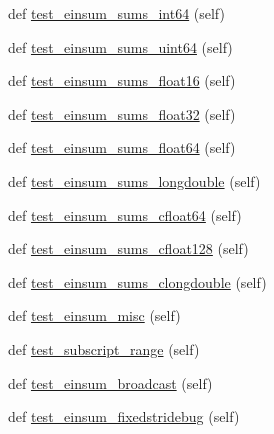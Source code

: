 \begin{DoxyCompactItemize}
def \hyperlink{classnumpy_1_1core_1_1tests_1_1test__einsum_1_1TestEinsum_aa2dd38c36119277677602bc46c2e0f1a}{test\+\_\+einsum\+\_\+sums\+\_\+int64} (self)
\item 
def \hyperlink{classnumpy_1_1core_1_1tests_1_1test__einsum_1_1TestEinsum_ab7b209c9221a5b3029df0ca154565142}{test\+\_\+einsum\+\_\+sums\+\_\+uint64} (self)
\item 
def \hyperlink{classnumpy_1_1core_1_1tests_1_1test__einsum_1_1TestEinsum_a722e8956945e9c36729a3aa8fa747ea9}{test\+\_\+einsum\+\_\+sums\+\_\+float16} (self)
\item 
def \hyperlink{classnumpy_1_1core_1_1tests_1_1test__einsum_1_1TestEinsum_abf27c0fde3488d8520919bbbaedc9920}{test\+\_\+einsum\+\_\+sums\+\_\+float32} (self)
\item 
def \hyperlink{classnumpy_1_1core_1_1tests_1_1test__einsum_1_1TestEinsum_a16195da60b307dffff623d81f641a70b}{test\+\_\+einsum\+\_\+sums\+\_\+float64} (self)
\item 
def \hyperlink{classnumpy_1_1core_1_1tests_1_1test__einsum_1_1TestEinsum_a954d7ff653c47415f84c746c347609b7}{test\+\_\+einsum\+\_\+sums\+\_\+longdouble} (self)
\item 
def \hyperlink{classnumpy_1_1core_1_1tests_1_1test__einsum_1_1TestEinsum_a37d38f4773cf145da8b882f6b84e7920}{test\+\_\+einsum\+\_\+sums\+\_\+cfloat64} (self)
\item 
def \hyperlink{classnumpy_1_1core_1_1tests_1_1test__einsum_1_1TestEinsum_a9a2526851d0f6e936d144f139114e751}{test\+\_\+einsum\+\_\+sums\+\_\+cfloat128} (self)
\item 
def \hyperlink{classnumpy_1_1core_1_1tests_1_1test__einsum_1_1TestEinsum_a0135e9c79ad8c895af97d55393516587}{test\+\_\+einsum\+\_\+sums\+\_\+clongdouble} (self)
\item 
def \hyperlink{classnumpy_1_1core_1_1tests_1_1test__einsum_1_1TestEinsum_a128f50dac230f1d5e4d26d306ad8b0a0}{test\+\_\+einsum\+\_\+misc} (self)
\item 
def \hyperlink{classnumpy_1_1core_1_1tests_1_1test__einsum_1_1TestEinsum_a0e4a08cfb027eba96ee6a6f56c0ecacf}{test\+\_\+subscript\+\_\+range} (self)
\item 
def \hyperlink{classnumpy_1_1core_1_1tests_1_1test__einsum_1_1TestEinsum_a6e0b816c1be68eba515dfc6253ab11d7}{test\+\_\+einsum\+\_\+broadcast} (self)
\item 
def \hyperlink{classnumpy_1_1core_1_1tests_1_1test__einsum_1_1TestEinsum_a033f3c30d9d38b8313fd02464ea64c1c}{test\+\_\+einsum\+\_\+fixedstridebug} (self)
\item 

\end{DoxyCompactItemize}
